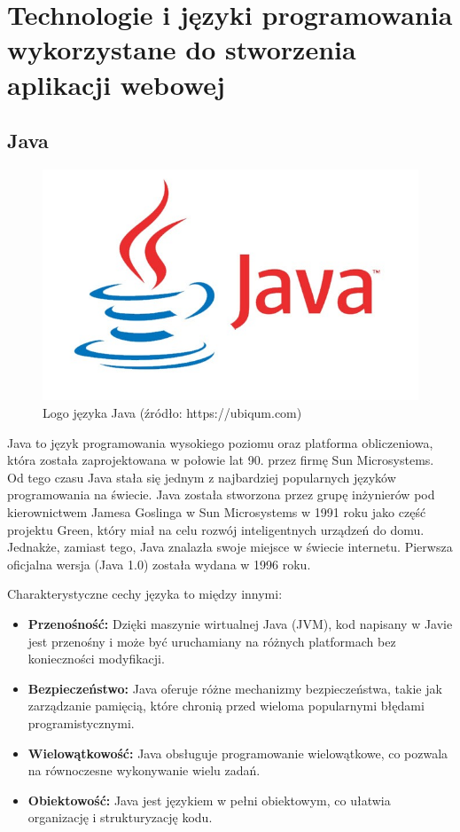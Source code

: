 \chapter{Technologie i języki programowania wykorzystane do stworzenia aplikacji webowej}

\section{Java}
\begin{figure}[h]
    \centering
    \includegraphics[width=0.7\linewidth]{./img/javalogo.jpg}
    \caption{Logo języka Java (źródło: https://ubiqum.com)}
    \label{fig:Java}
\end{figure}
Java to język programowania wysokiego poziomu oraz platforma obliczeniowa, która została zaprojektowana w połowie lat 90. przez firmę Sun Microsystems. Od tego czasu Java stała się jednym z najbardziej popularnych języków programowania na świecie. Java została stworzona przez grupę inżynierów pod kierownictwem Jamesa Goslinga w Sun Microsystems w 1991 roku jako część projektu Green, który miał na celu rozwój inteligentnych urządzeń do domu. Jednakże, zamiast tego, Java znalazła swoje miejsce w świecie internetu. Pierwsza oficjalna wersja (Java 1.0) została wydana w 1996 roku.

Charakterystyczne cechy języka to między innymi:
\begin{itemize}
\item \textbf{Przenośność:} Dzięki maszynie wirtualnej Java (JVM), kod napisany w Javie jest przenośny i może być uruchamiany na różnych platformach bez konieczności modyfikacji.
\item \textbf{Bezpieczeństwo:} Java oferuje różne mechanizmy bezpieczeństwa, takie jak zarządzanie pamięcią, które chronią przed wieloma popularnymi błędami programistycznymi.
\item \textbf{Wielowątkowość:} Java obsługuje programowanie wielowątkowe, co pozwala na równoczesne wykonywanie wielu zadań.
\item \textbf{Obiektowość:} Java jest językiem w pełni obiektowym, co ułatwia organizację i strukturyzację kodu.
\end{itemize}

